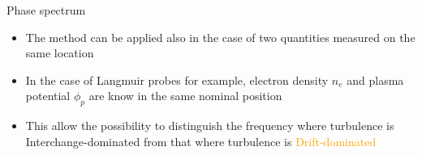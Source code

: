 \documentclass[t,10pt]{beamer}
\begin{document}
\begin{frame}{Phase spectrum}
\begin{itemize}[<+->]
\item The method can be applied also in the case of two quantities
  measured on the same location
\item In the case of Langmuir probes for example, electron density
  $n_e$ and plasma potential $\phi_p$ are know in the same nominal
  position


\item This allow the possibility to distinguish the frequency where
  turbulence is \textcolor{rfxcyan}{Interchange-dominated} from that
  where turbulence is \textcolor{orange}{Drift-dominated}
\end{itemize}
\end{frame}
\end{document}
